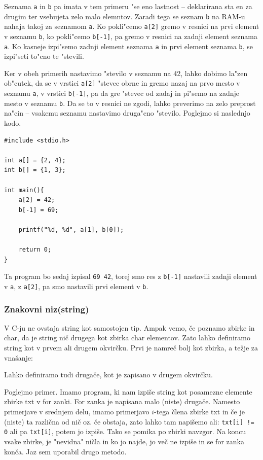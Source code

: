 \documentclass[a4paper, 12pt]{article}
\begin{document}
Seznama  \lstinline|a| in \lstinline|b| pa imata v tem primeru "se eno lastnost -- deklarirana sta en za drugim ter vsebujeta zelo malo elemntov. Zaradi tega se seznam \lstinline|b| na RAM-u nahaja takoj za seznamom \lstinline|a|. Ko pokli"cemo \lstinline|a[2]| gremo v resnici na prvi element v seznamu \texttt{b}, ko pokli"cemo \lstinline|b[-1]|, pa gremo v resnici na zadnji element seznama \texttt{a}. Ko kasneje izpi"semo zadnji element seznama \texttt{a} in prvi element seznama \texttt{b}, se izpi"seti to"cno te "stevili. 

Ker v obeh primerih nastavimo "stevilo v seznamu na 42, lahko dobimo la"zen ob"cutek, da se v vrstici \lstinline|a[2]| "stevec obrne in gremo nazaj na prvo mesto v seznamu \texttt{a}, v vrstici \lstinline|b[-1]|, pa da gre "stevec od zadaj in pi"semo na zadnje mesto v seznamu \texttt{b}. Da se to v resnici ne zgodi, lahko preverimo na zelo preprost na"cin -- vsakemu seznamu nastavimo druga"cno "stevilo. Poglejmo si naslednjo kodo.

\begin{lstlisting}[caption = Zbirke primer]
#include <stdio.h>

int a[] = {2, 4};
int b[] = {1, 3};

int main(){
	a[2] = 42;
	b[-1] = 69;

	printf("%d, %d", a[1], b[0]);

	return 0;
}
\end{lstlisting}

Ta program bo sedaj izpisal \texttt{69 42}, torej smo res z \lstinline|b[-1]| nastavili zadnji element v \texttt{a}, z \lstinline|a[2]|, pa smo nastavili prvi element v \texttt{b}.
%
\subsubsection{Znakovni niz(string)}
V C-ju ne ovstaja string kot samostojen tip. Ampak vemo, če poznamo zbirke in char, da je string nič drugega kot zbirka char elementov. Zato lahko definiramo string kot v prvem ali drugem okvirčku. Prvi je namreč bolj kot zbirka, a težje za vnašanje:
\begin{center}
\end{center}

Lahko definiramo tudi drugače, kot je zapisano v drugem okvirčku.

Poglejmo primer. Imamo program, ki nam izpiše string kot posamezne elemente zbirke txt v for zanki. For zanka je napisana malo (niste) drugače. Namesto primerjave v srednjem delu, imamo primerjavo $i$-tega člena zbirke txt in če je (niste) ta različna od nič oz. če obstaja, zato lahko tam napišemo ali: \texttt{txt[i] != 0} ali pa \texttt{txt[i]}, potem jo izpiše. Tako se pomika po zbirki navzgor. Na koncu vsake zbirke, je "nevidna" ničla in ko jo najde, jo več ne izpiše in se for zanka konča. Jaz sem uporabil drugo metodo.
\end{document}

